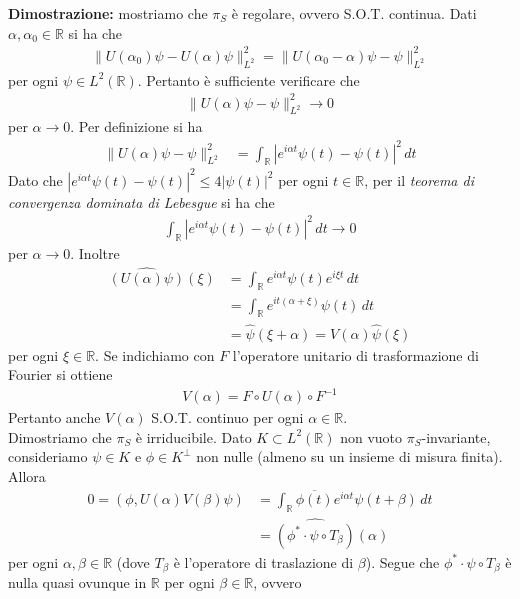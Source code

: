 \documentclass{article}
\numberwithin{equation}{subsection}
\begin{document}
\textbf{Dimostrazione:} mostriamo che $\pi_S$ è regolare, ovvero S.O.T. continua. Dati $\alpha, \alpha_0 \in \mathbb{R}$ si ha che
\begin{align*}
    \|U(\alpha_0)\psi - U(\alpha)\psi\|^2_{L^2} = \|U(\alpha_0 - \alpha)\psi - \psi\|^2_{L^2}
\end{align*}
per ogni $\psi \in L^2(\mathbb{R})$. Pertanto è sufficiente verificare che
\begin{align*}
    \|U(\alpha)\psi - \psi\|^2_{L^2} \rightarrow 0
\end{align*} 
per $\alpha \rightarrow 0$. Per definizione si ha
\begin{align*}
    \|U(\alpha)\psi - \psi\|^2_{L^2} &= \int_{\mathbb{R}} |e^{i\alpha t}\psi(t) - \psi(t)|^2 \, dt
\end{align*}
Dato che $|e^{i\alpha t}\psi(t) - \psi(t)|^2 \leq 4|\psi(t)|^2$ per ogni $t \in \mathbb{R}$, per il \textit{teorema di convergenza dominata di Lebesgue} si ha che
\begin{align*}
    \int_{\mathbb{R}} |e^{i\alpha t}\psi(t) - \psi(t)|^2 \, dt \rightarrow 0
\end{align*}
per $\alpha \rightarrow 0$. Inoltre
\begin{align*}
    \widehat{(U(\alpha)\psi)}(\xi) &= \int_{\mathbb{R}} e^{i\alpha t}\psi(t)e^{i\xi t} \, dt \\
    &= \int_{\mathbb{R}} e^{it(\alpha + \xi)}\psi(t) \, dt \\
    &= \widehat{\psi}(\xi + \alpha) = V(\alpha)\widehat{\psi}(\xi)
\end{align*}
per ogni $\xi \in \mathbb{R}$. Se indichiamo con $F$ l'operatore unitario di trasformazione di Fourier si ottiene
\begin{align*}
    V(\alpha) = F \circ U(\alpha) \circ F^{-1}
\end{align*}
Pertanto anche $V(\alpha)$ S.O.T. continuo per ogni $\alpha \in \mathbb{R}$. \\
Dimostriamo che $\pi_S$ è irriducibile. Dato $K \subset L^2(\mathbb{R})$ non vuoto $\pi_S$-invariante, consideriamo $\psi \in K$ e $\phi \in K^\perp$ non nulle (almeno su un insieme di misura finita). Allora
\begin{align*}
    0 = (\phi, U(\alpha)V(\beta)\psi) &= \int_{\mathbb{R}} \overline{\phi(t)}e^{i\alpha t}\psi(t + \beta) \, dt \\
    &= \widehat{(\phi^* \cdot \psi \circ T_\beta)}(\alpha)
\end{align*}
per ogni $\alpha, \beta \in \mathbb{R}$ (dove $T_\beta$ è l'operatore di traslazione di $\beta$). Segue che $\phi^* \cdot \psi \circ T_\beta$ è nulla quasi ovunque in $\mathbb{R}$ per ogni $\beta \in \mathbb{R}$, ovvero
\end{document}
